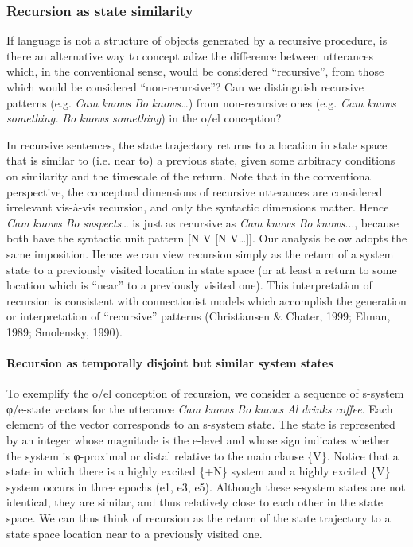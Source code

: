 \subsubsection{Recursion as state similarity}

If language is not a structure of objects generated by a recursive procedure, is there an alternative way to conceptualize the difference between utterances which, in the conventional sense, would be considered “recursive”, from those which would be considered “non-recursive”? Can we distinguish recursive patterns (e.g. \textit{Cam} \textit{knows} \textit{Bo} \textit{knows…}) from non-recursive ones (e.g. \textit{Cam} \textit{knows} \textit{something.} \textit{Bo} \textit{knows} \textit{something}) in the o/el conception? 

  In recursive sentences, the state trajectory returns to a location in state space that is similar to (i.e. near to) a previous state, given some arbitrary conditions on similarity and the timescale of the return. Note that in the conventional perspective, the conceptual dimensions of recursive utterances are considered irrelevant vis-à-vis recursion, and only the syntactic dimensions matter. Hence \textit{Cam} \textit{knows} \textit{Bo} \textit{suspects…} is just as recursive as \textit{Cam} \textit{knows} \textit{Bo} \textit{knows}..., because both have the syntactic unit pattern [N V [N V…]]. Our analysis below adopts the same imposition. Hence we can view recursion simply as the return of a system state to a previously visited location in state space (or at least a return to some location which is “near” to a previously visited one). This interpretation of recursion is consistent with connectionist models which accomplish the generation or interpretation of “recursive” patterns (Christiansen \& Chater, 1999; Elman, 1989; Smolensky, 1990).

\paragraph{Recursion as temporally disjoint but similar system states}

To exemplify the o/el conception of recursion, we consider a sequence of s-system φ/e-state vectors for the utterance \textit{Cam} \textit{knows} \textit{Bo} \textit{knows} \textit{Al} \textit{drinks} \textit{coffee}. Each element of the vector corresponds to an s-system state. The state is represented by an integer whose magnitude is the e-level and whose sign indicates whether the system is φ-proximal or distal relative to the main clause \{V\}. Notice that a state in which there is a highly excited \{+N\} system and a highly excited \{V\} system occurs in three epochs (e1, e3, e5). Although these s-system states are not identical, they are similar, and thus relatively close to each other in the state space. We can thus think of recursion as the return of the state trajectory to a state space location near to a previously visited one.

